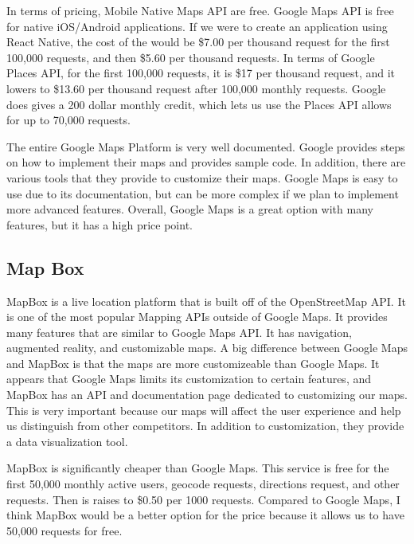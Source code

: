 \documentclass[draftclsnofoot, onecolumn, compsoc, 10pt]{IEEEtran}
\begin{document}
    In terms of pricing, Mobile Native Maps API are free. Google Maps API is free for native iOS/Android applications. If we were to create an application using React Native, the cost of the would be \$7.00 per thousand request for the first 100,000 requests, and then \$5.60 per thousand requests. In terms of Google Places API, for the first 100,000 requests, it is \$17 per thousand request, and it lowers to \$13.60 per thousand request after 100,000 monthly requests. Google does gives a 200 dollar monthly credit, which lets us use the Places API allows for up to 70,000 requests.
    
    The entire Google Maps Platform is very well documented. Google provides steps on how to implement their maps and provides sample code. In addition, there are various tools that they provide to customize their maps. Google Maps is easy to use due to its documentation, but can be more complex if we plan to implement more advanced features. Overall, Google Maps is a great option with many features, but it has a high price point.
    \cite{GoogleMaps}

	\subsection{Map Box}
	MapBox is a live location platform that is built off of the OpenStreetMap API. It is one of the most popular Mapping APIs outside of Google Maps. It provides many features that are similar to Google Maps API. It has navigation, augmented reality, and customizable maps. A big difference between Google Maps and MapBox is that the maps are more customizeable than Google Maps. It appears that Google Maps limits its customization to certain features, and MapBox has an API and documentation page dedicated to customizing our maps. This is very important because our maps will affect the user experience and help us distinguish from other competitors. In addition to customization, they provide a data visualization tool. 

    MapBox is significantly cheaper than Google Maps. This service is free for the first 50,000 monthly active users, geocode requests, directions request, and other requests. Then is raises to \$0.50 per 1000 requests. Compared to Google Maps, I think MapBox would be a better option for the price because it allows us to have 50,000 requests for free.
\end{document}
